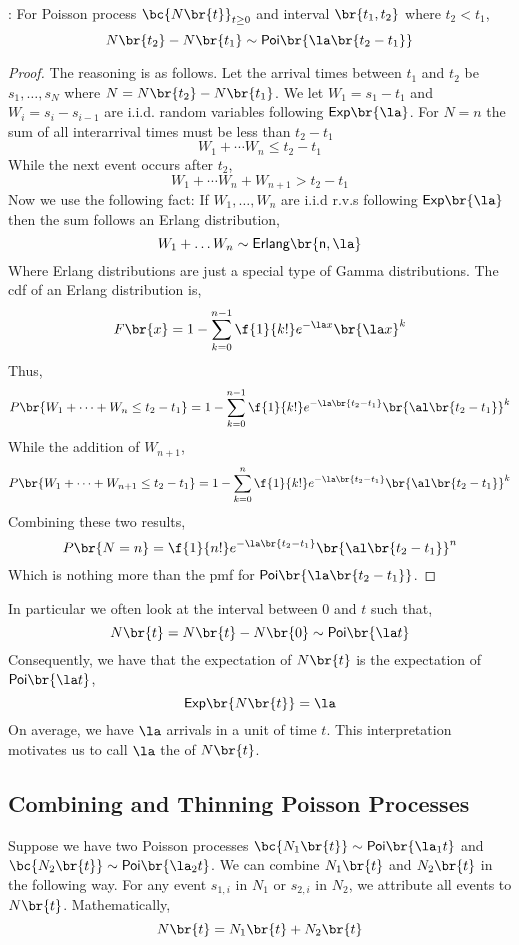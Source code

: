 \documentclass{article}
\newcommand{\Poi}{\mathsf{Poi}}
\newcommand{\Ex}{\mathsf{Exp}}
\begin{document}
    \begin{theorem}
        : For Poisson process $\bc{N\br{t}}_{t \geq 0}$ and interval $\br{t_1, t_2}$ where $t_2 < t_1$,
        \[ N\br{t_2} - N\br{t_1} \sim \Poi\br{\la\br{t_2 - t_1}} \]
    \end{theorem}
    \begin{proof}
    The reasoning is as follows. Let the arrival times between $t_1$ and $t_2$ be $s_1, \ldots, s_N$ where $N = N\br{t_2} - N\br{t_1}$. We let $W_1 = s_1 - t_1$ and $W_i = s_i - s_{i-1}$ are i.i.d. random variables following $\Ex\br{\la}$. For $N = n$ the sum of all interarrival times must be less than $t_2 - t_1$
    \[ W_1 + \cdots W_n \leq t_2 - t_1 \]
    While the next event occurs after $t_2$,
    \[ W_1 + \cdots W_n + W_{n+1} > t_2 - t_1 \]
    Now we use the following fact: If $W_1, \ldots, W_n$ are i.i.d r.v.s following $\Ex\br{\la}$ then the sum follows an Erlang distribution,
    \[ W_1 + \ldots W_n \sim \sf{Erlang}\br{n ,\la}  \]
    Where Erlang distributions are just a special type of Gamma distributions. The cdf of an Erlang distribution is,
    \[ F\br{x} = 1 - \sum_{k=0}^{n-1} \f{1}{k!} e^{- \la x} \br{\la x}^{k} \]
    Thus,
    \[ P\br{W_1 + \cdots + W_n \leq t_2 - t_1} = 1 - \sum_{k=0}^{n-1} \f{1}{k!} e^{-\la \br{t_2 - t_1}} \br{\al \br{t_2 - t_1}}^k \]
    While the addition of $W_{n+1}$,
    \[ P\br{W_1 + \cdots + W_{n+1} \leq t_2 - t_1} = 1 - \sum_{k=0}^{n} \f{1}{k!} e^{-\la \br{t_2 - t_1}} \br{\al \br{t_2 - t_1}}^k \]
    Combining these two results,
    \[ P\br{N=n} = \f{1}{n!} e^{-\la \br{t_2 - t_1}} \br{\al \br{t_2 - t_1}}^n \]
    Which is nothing more than the pmf for $\Poi\br{\la\br{t_2 - t_1}}$.
    \end{proof}
    In particular we often look at the interval between $0$ and $t$ such that,
    \[ N\br{t} = N\br{t} - N\br{0} \sim \Poi\br{\la t} \]
    Consequently, we have that the expectation of $N\br{t}$ is the expectation of $\Poi\br{\la t}$,
    \[ \Ex\br{N\br{t}} = \la \]
    On average, we have $\la$ arrivals in a unit of time $t$. This interpretation motivates us to call $\la$ the  of $N\br{t}$.\\

    \subsection{Combining and Thinning Poisson Processes}

    Suppose we have two Poisson processes $\bc{N_1\br{t}} \sim \Poi \br{\la_1 t}$ and $\bc{N_2\br{t}} \sim \Poi \br{\la_2 t}$. We can combine $N_1\br{t}$ and $N_2\br{t}$ in the following way. For any event $s_{1,i}$ in $N_1$ or $s_{2,i}$ in $N_2$, we attribute all events to $N\br{t}$. Mathematically,
    \[ N\br{t} = N_1\br{t} + N_2\br{t} \]
\end{document}
